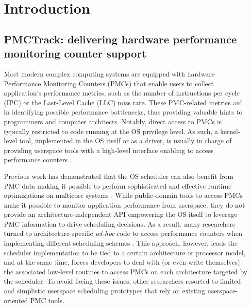 \chapter{Introduction}


\section{PMCTrack: delivering hardware performance monitoring
counter support}\label{pmctrack-management-of-the-hardware-performance-monitoring-counters}

Most modern complex computing systems are equipped with hardware
Performance Monitoring Counters (PMCs) that enable users to collect
application's performance metrics, such as the number of instructions
per cycle (IPC) or the Last-Level Cache (LLC) miss rate. These
PMC-related metrics aid in identifying possible performance bottlenecks,
thus providing valuable hints to programmers and computer architects.
Notably, direct access to PMCs is typically restricted to code running
at the OS privilege level. As such, a kernel-level tool, implemented in
the OS itself or as a driver, is usually in charge of providing
userspace tools with a high-level interface enabling to access
performance counters \cite{perfevents,perfmon2,oprofile}.

Previous work has demonstrated that the OS scheduler can also benefit
from PMC data making it possible to perform sophisticated and effective
runtime optimizations on multicore systems
\cite{observations,cache-aware-asplos,merkel-eurosys10,akula,intel-amp,camp,petrucci-tecs15,acfs}.
While public-domain tools to access PMCs make it possible to monitor
application performance from userspace, they do not provide an
architecture-independent API empowering the OS itself to leverage PMC
information to drive scheduling decisions. As a result, many researchers
turned to architecture-specific \textit{ad-hoc} code to access
performance counters when implementing different scheduling schemes
\cite{observations,intel-amp,camp,acfs}. This approach, however, leads
the scheduler implementation to be tied to a certain architecture or
processor model, and at the same time, forces developers to deal with
(or even write themselves) the associated low-level routines to access
PMCs on each architecture targeted by the scheduler. To avoid facing
these issues, other researchers resorted to limited and simplistic
userspace scheduling prototypes
\cite{cache-aware-asplos,akula,petrucci-tecs15} that rely on existing
userspace-oriented PMC tools.

